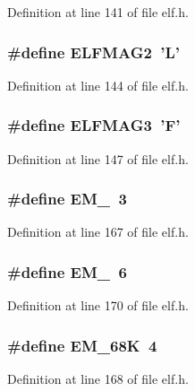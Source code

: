 Definition at line 141 of file elf.h.
\subsubsection[{ELFMAG2}]{\setlength{\rightskip}{0pt plus 5cm}\#define ELFMAG2~'L'}\label{elf_8h_8ac1b98d78e30ca49e1d3f287939a18f}




Definition at line 144 of file elf.h.
\subsubsection[{ELFMAG3}]{\setlength{\rightskip}{0pt plus 5cm}\#define ELFMAG3~'F'}\label{elf_8h_2beeae5974769f72da5f63dcbcc325fe}




Definition at line 147 of file elf.h.
\subsubsection[{EM\_\-386}]{\setlength{\rightskip}{0pt plus 5cm}\#define EM\_~3}\label{elf_8h_77301c665274669ba8d05978eb0d299e}




Definition at line 167 of file elf.h.
\subsubsection[{EM\_\-486}]{\setlength{\rightskip}{0pt plus 5cm}\#define EM\_~6}\label{elf_8h_30d75bc66f7816194718e1711f6df9a8}




Definition at line 170 of file elf.h.
\subsubsection[{EM\_\-68K}]{\setlength{\rightskip}{0pt plus 5cm}\#define EM\_\-68K~4}\label{elf_8h_cc74dd2d7cd1e872c2d2f52d64a7982a}




Definition at line 168 of file elf.h.
